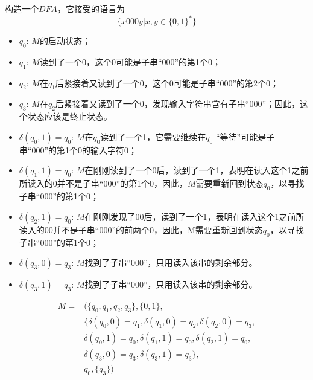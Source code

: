 \begin{example}构造一个$DFA$，它接受的语言为
	\[\{x000y|x,y\in\{0,1\}^{\ast}\}\]
	\begin{itemize}
		\item $q_0$: $M$的启动状态；
	    \item $q_1$: $M$读到了一个0，这个0可能是子串“000”的第1个0；
	    \item $q_2$: $M$在$q_1$后紧接着又读到了一个0，这个0可能是子串“000”的第2个0；
		\item $q_3$: $M$在$q_2$后紧接着又读到了一个0，发现输入字符串含有子串“000”；因此，这个状态应该是终止状态。
	    \item $\delta(q_0,1)= q_0$: $M$在$q_0$读到了一个1，它需要继续在$q_0$ “等待”可能是子串“000”的第1个0的输入字符0；
		\item $\delta(q_1,1)= q_0$: $M$在刚刚读到了一个0后，读到了一个1，表明在读入这个1之前所读入的0并不是子串“000”的第1个0，因此，$M$需要重新回到状态$q_0$，以寻找子串“000”的第1个0；
		
		\item $\delta(q_2,1)= q_0$: $M$在刚刚发现了00后，读到了一个1，表明在读入这个1之前所读入的00并不是子串“000”的前两个0，因此，M需要重新回到状态$q_0$，以寻找子串“000”的第1个0；
		
		\item $\delta(q_3,0)= q_3$: $M$找到了子串“000”，只用读入该串的剩余部分。
		
		\item $\delta(q_3,1)= q_3$: $M$找到了子串“000”，只用读入该串的剩余部分。	
	\end{itemize}
	\begin{align*} 
	M=&(\{q_0,q_1,q_2,q_3\},\{0,1\},\\
	&\{\delta(q_0,0)=q_1,\delta(q_1,0)=q_2,\delta(q_2,0)=q_3,\\
	&\delta(q_0,1)=q_0,\delta(q_1,1)=q_0,\delta(q_2,1)=q_0,\\
	&\delta(q_3,0)=q_3,\delta(q_3,1)=q_3\},\\
	&q_0,\{q_3\})
	\end{align*}
	

\end{example}
